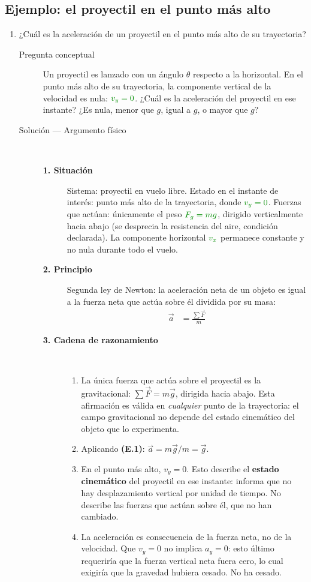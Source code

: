 \documentclass[11pt]{book}
\newcommand{\dato}[1]{\textcolor{colDatos}{#1}}
\begin{document}
\subsection*{Ejemplo: el proyectil en el punto más alto}

\begin{enumerate}
\item ¿Cuál es la aceleración de un proyectil en el punto más alto de su trayectoria?

\begin{description}
\item[Pregunta conceptual]
Un proyectil es lanzado con un ángulo $\theta$ respecto a la horizontal. En el punto más alto de su trayectoria, la componente vertical de la velocidad es nula: $\dato{v_y = 0}$. ¿Cuál es la aceleración del proyectil en ese instante? ¿Es nula, menor que $g$, igual a $g$, o mayor que $g$?

\item[Solución --- Argumento físico]~

\begin{description}
    \item[\textbf{1. Situación}]
    Sistema: proyectil en vuelo libre. Estado en el instante de interés: punto más alto de la trayectoria, donde $\dato{v_y = 0}$. Fuerzas que actúan: únicamente el peso $\dato{F_g = mg}$, dirigido verticalmente hacia abajo (se desprecia la resistencia del aire, condición declarada). La componente horizontal $\dato{v_x}$ permanece constante y no nula durante todo el vuelo.

    \item[\textbf{2. Principio}]
    Segunda ley de Newton: la aceleración neta de un objeto es igual a la fuerza neta que actúa sobre él dividida por su masa:
    \begin{align}
        \vec{a} &= \frac{\sum \vec{F}}{m} \tag{E.1}
    \end{align}

    \item[\textbf{3. Cadena de razonamiento}]~
    \begin{enumerate}
        \item[\textbf{(i)}] La única fuerza que actúa sobre el proyectil es la gravitacional: $\sum \vec{F} = m\vec{g}$, dirigida hacia abajo. Esta afirmación es válida en {\it cualquier} punto de la trayectoria: el campo gravitacional no depende del estado cinemático del objeto que lo experimenta.
        \item[\textbf{(ii)}] Aplicando \textbf{(E.1)}: $\vec{a} = m\vec{g}/m = \vec{g}$.
        \item[\textbf{(iii)}] En el punto más alto, $v_y = 0$. Esto describe el {\bf estado cinemático} del proyectil en ese instante: informa que no hay desplazamiento vertical por unidad de tiempo. No describe las fuerzas que actúan sobre él, que no han cambiado.
        \item[\textbf{(iv)}] La aceleración es consecuencia de la fuerza neta, no de la velocidad. Que $v_y = 0$ no implica $a_y = 0$: esto último requeriría que la fuerza vertical neta fuera cero, lo cual exigiría que la gravedad hubiera cesado. No ha cesado.
    \end{enumerate}


\end{description}
\end{description}
\end{enumerate}
\end{document}
